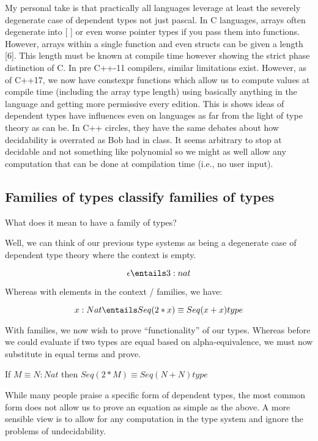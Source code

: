 \documentclass[11pt]{article}
\begin{document}
My personal take is that practically all languages leverage at least the severely degenerate case of dependent types not just pascal. In C languages, arrays often degenerate into [ ] or even worse pointer types if you pass them into functions. However, arrays within a single function and even structs can be given a length [6]. This length must be known at compile time however showing the strict phase distinction of C. In pre C++-11 compilers, similar limitations exist. However, as of C++17, we now have constexpr functions which allow us to compute values at compile time (including the array type length) using basically anything in the language and getting more permissive every edition. This is shows ideas of dependent types have influences even on languages as far from the light of type theory as can be. In C++ circles, they have the same debates about how decidability is overrated as Bob had in class. It seems arbitrary to stop at decidable and not something like polynomial so we might as well allow any computation that can be done at compilation time (i.e., no user input).

\subsection*{Families of types classify families of types}

What does it mean to have a family of types?

Well, we can think of our previous type systems as being a degenerate case of dependent type theory where the context is empty.

$$\epsilon \entails 3 : nat$$

Whereas with elements in the context / families, we have:

$$x : Nat \entails Seq(2 * x) \equiv Seq(x + x) type$$

With families, we now wish to prove ``functionality'' of our types. Whereas before we could evaluate if two types are equal based on alpha-equivalence, we must now substitute in equal terms and prove.

If $M \equiv N : Nat$ then $Seq(2 * M) \equiv Seq(N + N) type$

While many people praise a specific form of dependent types, the most common form does not allow us to prove an equation as simple as the above. A more sensible view is to allow for any computation in the type system and ignore the problems of undecidability.
\end{document}
